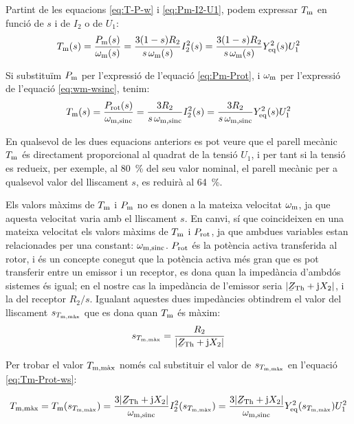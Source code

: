 Partint de les equacions \eqref{eq:T-P-w} i \eqref{eq:Pm-I2-U1}, podem expressar  $T_\mathrm{m}$ en funció de $s$ i de $I_2$ o de $U_1$:
\begin{equation}
    T_\mathrm{m}(s)  =  \frac{P_\mathrm{m}(s)}{\omega_\mathrm{m}(s)} =  \frac{3(1-s) R_2}{s\,\omega_\mathrm{m}(s)} I_2^2(s) =
     \frac{3(1-s) R_2}{s\,\omega_\mathrm{m}(s)} Y_\mathrm{eq}^2(s) U_1^2
\end{equation}

Si substituïm $P_\mathrm{m}$ per l'expressió de l'equació \eqref{eq:Pm-Prot}, i $\omega_\mathrm{m}$ per l'expressió de l'equació \eqref{eq:wm-wsinc}, tenim:
\begin{equation}\index{motors d'inducció!parell mecànic}
    T\ped{m}(s)  =  \frac{P\ped{rot}(s)}{\omega\ped{m,sinc}} =   \frac{3 R_2}{s\,\omega\ped{m,sinc}} I_2^2(s) =
     \frac{3 R_2}{s\,\omega\ped{m,sinc}} Y\ped{eq}^2(s) U_1^2 \label{eq:Tm-Prot-ws}
\end{equation}

En qualsevol de les dues equacions anteriors es pot veure que el parell mecànic $T_\mathrm{m}$ és directament proporcional al quadrat de la tensió $U_1$, i per tant si la tensió es redueix, per exemple, al \SI{80}{\%} del seu valor nominal, el parell mecànic per a qualsevol valor del lliscament $s$,  es reduirà al \SI{64}{\%}.

Els valors màxims de $T_\mathrm{m}$ i $P_\mathrm{m}$ no es donen a la mateixa velocitat  $\omega_\mathrm{m}$, ja que aquesta velocitat varia amb el lliscament $s$. En canvi, sí que coincideixen en una mateixa velocitat els valors  màxims de $T_\mathrm{m}$ i $P_\mathrm{rot}$, ja que ambdues variables estan relacionades per una constant: $\omega_\mathrm{m,sinc}$. $P_\mathrm{rot}$ és la potència activa transferida al rotor, i és un concepte conegut que la potència activa més gran que es pot transferir entre un emissor i un receptor, es dona quan la impedància d'ambdós sistemes és igual; en el nostre cas la impedància de l'emissor seria $|\cmplx{Z}\ped{Th} + \ju X_2|$, i la del receptor $R_2/s$. Igualant aquestes dues impedàncies obtindrem el valor del lliscament $s_{T_\mathrm{m,\text{màx}}}$ que es dona quan $T_\mathrm{m}$ és màxim:
\begin{equation}
    s_{T\ped{m,\text{màx}}} =  \frac{R_2}{|\cmplx{Z}\ped{Th} + \ju X_2|} \label{eq:s-T-max}
\end{equation}

Per trobar el valor  $T_\mathrm{m,\text{màx}}$ només cal substituir el valor de $s_{T_\mathrm{m,\text{màx}}}$ en l'equació \eqref{eq:Tm-Prot-ws}:

\begin{equation}
    T\ped{m,\text{màx}}  =  T\ped{m}(s_{T\ped{m,\text{màx}}}) =  \frac{3 |\cmplx{Z}\ped{Th} + \ju X_2|}{\omega\ped{m,sinc}} I_2^2(s_{T\ped{m,\text{màx}}}) = \frac{3 |\cmplx{Z}\ped{Th} + \ju X_2|}{\omega\ped{m,sinc}} Y\ped{eq}^2(s_{T\ped{m,\text{màx}}}) U_1^2
\end{equation}


